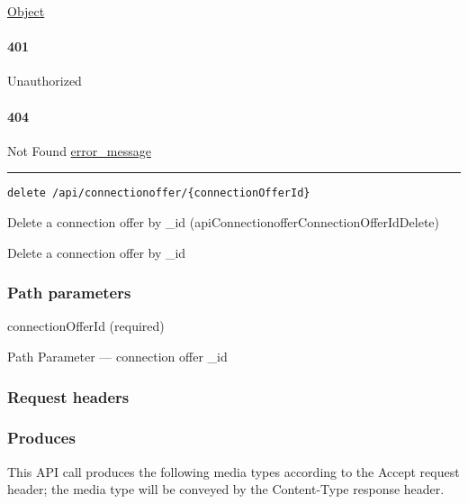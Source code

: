 \protect\hyperlink{Object}{Object}

\hypertarget{section-497}{%
\paragraph{401}\label{section-497}}

Unauthorized \protect\hyperlink{}{}

\hypertarget{section-498}{%
\paragraph{404}\label{section-498}}

Not Found \protect\hyperlink{error_message}{error\_message}

\begin{center}\rule{0.5\linewidth}{\linethickness}\end{center}

\protect\hypertarget{apiConnectionofferConnectionOfferIdDelete}{}{}

\begin{verbatim}
delete /api/connectionoffer/{connectionOfferId}
\end{verbatim}

Delete a connection offer by \_id
({apiConnectionofferConnectionOfferIdDelete})

Delete a connection offer by \_id

\hypertarget{path-parameters-84}{%
\subsubsection{Path parameters}\label{path-parameters-84}}

connectionOfferId (required)

{Path Parameter} --- connection offer \_id

\hypertarget{request-headers-81}{%
\subsubsection{Request headers}\label{request-headers-81}}

\hypertarget{produces-150}{%
\subsubsection{Produces}\label{produces-150}}

This API call produces the following media types according to the
{Accept} request header; the media type will be conveyed by the
{Content-Type} response header.

